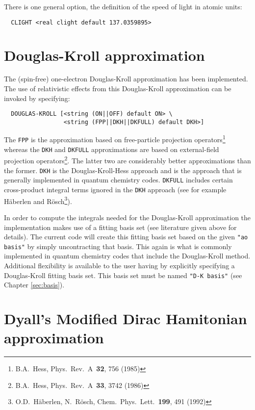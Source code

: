 There is one general option, the definition of the speed of light in atomic units:

\begin{verbatim}
  CLIGHT <real clight default 137.0359895>
\end{verbatim}

\section{Douglas-Kroll approximation}
\label{sec:douglas-kroll}


The (spin-free) one-electron Douglas-Kroll approximation has been
implemented. The use of relativistic effects from this Douglas-Kroll
approximation can be invoked by specifying:

\begin{verbatim}
  DOUGLAS-KROLL [<string (ON||OFF) default ON> \
                 <string (FPP||DKH||DKFULL) default DKH>]

\end{verbatim}

The \verb+FPP+ is the approximation based on free-particle projection 
operators\footnote{B.A.~Hess, Phys.~Rev.~A~{\bf 32}, 756 (1985)} whereas the 
\verb+DKH+ and \verb+DKFULL+ approximations are based on external-field 
projection operators\footnote{B.A.~Hess, Phys.~Rev.~A~{\bf 33}, 3742 (1986)}.
The latter two are considerably better approximations than the former. \verb+DKH+ 
is the Douglas-Kroll-Hess approach and is the approach that is generally 
implemented in quantum chemistry codes. \verb+DKFULL+ includes certain 
cross-product integral terms ignored in the \verb+DKH+ approach (see for example 
H\"{a}berlen and R\"{o}sch\footnote{O.D.~H\"{a}berlen, N.~R\"{o}sch, 
Chem.~Phys.~Lett.~{\bf 199}, 491 (1992)}).

In order to compute the integrals needed for the Douglas-Kroll approximation
the implementation makes use of a fitting basis set (see literature given
above for details). The current code will create this fitting basis set
based on the given {\tt "ao basis"} by simply uncontracting that basis. This
again is what is commonly implemented in quantum chemistry codes that
include the Douglas-Kroll method.  Additional flexibility is available to
the user having by explicitly specifying a Douglas-Kroll fitting basis
set. This basis set must be named {\tt "D-K basis"} (see Chapter
\ref{sec:basis}).

\section{Dyall's Modified Dirac Hamitonian approximation}
\label{sec:dyall-mod-dir}


